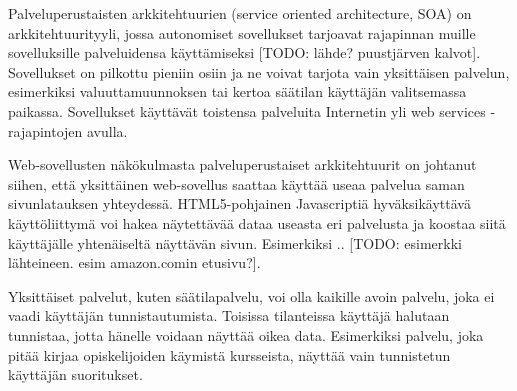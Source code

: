 Palveluperustaisten arkkitehtuurien (service oriented architecture, SOA) on arkkitehtuurityyli, jossa autonomiset sovellukset tarjoavat rajapinnan muille sovelluksille palveluidensa käyttämiseksi [TODO: lähde? puustjärven kalvot]. Sovellukset on pilkottu pieniin osiin ja ne voivat tarjota vain yksittäisen palvelun, esimerkiksi valuuttamuunnoksen tai kertoa säätilan käyttäjän valitsemassa paikassa. Sovellukset käyttävät toistensa palveluita Internetin yli web services -rajapintojen avulla.

Web-sovellusten näkökulmasta palveluperustaiset arkkitehtuurit on johtanut siihen, että yksittäinen web-sovellus saattaa käyttää useaa palvelua saman sivunlatauksen yhteydessä. HTML5-pohjainen Javascriptiä hyväksikäyttävä käyttöliittymä voi hakea näytettävää dataa useasta eri palvelusta ja koostaa siitä käyttäjälle yhtenäiseltä näyttävän sivun. Esimerkiksi .. [TODO: esimerkki lähteineen. esim amazon.comin etusivu?].

Yksittäiset palvelut, kuten säätilapalvelu, voi olla kaikille avoin palvelu, joka ei vaadi käyttäjän tunnistautumista. Toisissa tilanteissa käyttäjä halutaan tunnistaa, jotta hänelle voidaan näyttää oikea data. Esimerkiksi palvelu, joka pitää kirjaa opiskelijoiden käymistä kursseista, näyttää vain tunnistetun käyttäjän suoritukset.